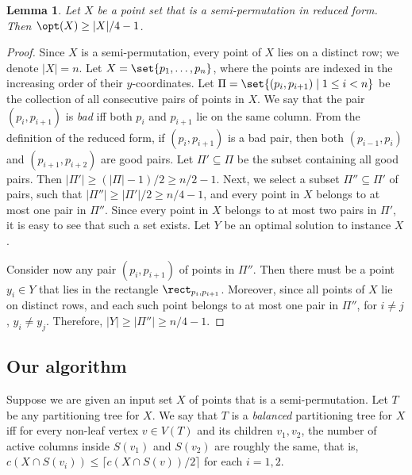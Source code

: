 \documentclass[11pt]{article}
\numberwithin{equation}{section}
\newtheorem{lemma}[theorem]{Lemma}
\theoremstyle{definition}
\theoremstyle{plain}
\begin{document}
\begin{lemma}\label{lem: bound on WB for reduced}
        Let $X$ be a point set that is a semi-permutation in reduced form. Then $\opt(X)\geq |X|/4-1$. 
\end{lemma}
\begin{proof}
Since $X$ is a semi-permutation, every point of $X$ lies on a distinct row; we denote $|X|=n$. Let $X=\set{p_1,\ldots,p_n}$, where the points are indexed in the increasing order of their $y$-coordinates. 
Let $\Pi=\set{(p_i,p_{i+1})\mid 1\leq i<n}$ be the collection of all consecutive pairs of points in $X$. We say that the pair $(p_i,p_{i+1})$ is \emph{bad} iff both $p_i$ and $p_{i+1}$ lie on the same column. From the definition of the reduced form, if $(p_i,p_{i+1})$ is a bad pair, then both $(p_{i-1},p_i)$ and $(p_{i+1},p_{i+2})$ are good pairs. Let $\Pi'\subseteq \Pi$ be the subset containing all good pairs. Then $|\Pi'|\geq (|\Pi|-1)/2\geq n/2-1$. Next, we select a subset $\Pi''\subseteq \Pi'$ of pairs, such that $|\Pi''|\geq |\Pi'|/2\geq n/4-1$, and every point in $X$ belongs to at most one pair in $\Pi''$. Since every point in $X$ belongs to at most two pairs in $\Pi'$, it is easy to see that such a set exists. Let $Y$ be an optimal solution to instance $X$.

Consider now any pair $(p_i,p_{i+1})$ of points in $\Pi''$. Then there must be a point $y_i\in Y$ that lies in the rectangle $\rect_{p_i,p_{i+1}}$. Moreover, since all points of $X$ lie on distinct rows, and each such point belongs to at most one pair in $\Pi''$, for $i\neq j$, $y_i\neq y_j$. Therefore, $|Y|\geq |\Pi''|\geq n/4-1$.
\end{proof}





\subsection{Our algorithm} 
\newcommand{\progspace}{\hspace{0.5cm}} 

Suppose we are given an input set $X$ of points that is a semi-permutation. Let $T$ be any partitioning tree for $X$. We say that $T$ is a \emph{balanced} partitioning tree for $X$ iff for every non-leaf vertex $v\in V(T)$ and its children $v_1,v_2$, the number of active columns inside $S(v_1)$ and $S(v_2)$ are roughly the same, that is, $c(X \cap S(v_i)) \leq \lceil c(X\cap S(v))/2 \rceil$ for each $i =1,2$. 

%
\end{document}
